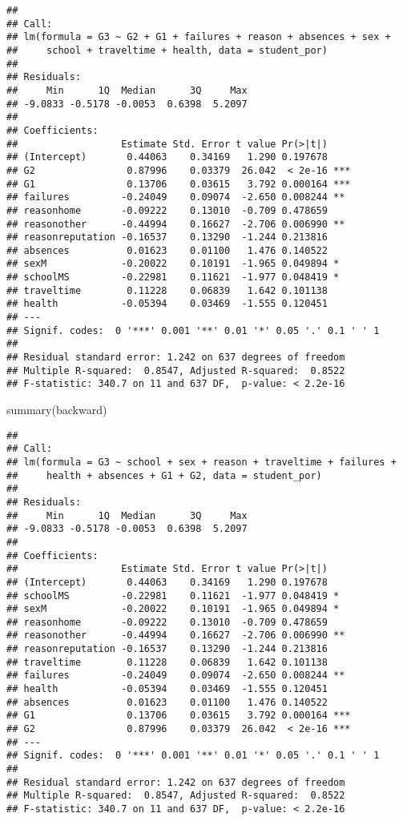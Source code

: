 \documentclass[
]{article}
\newenvironment{Shaded}{\begin{snugshade}}{\end{snugshade}}
\newcommand{\FunctionTok}[1]{\textcolor[rgb]{0.00,0.00,0.00}{#1}}
\newcommand{\NormalTok}[1]{#1}
\begin{document}
\begin{verbatim}
## 
## Call:
## lm(formula = G3 ~ G2 + G1 + failures + reason + absences + sex + 
##     school + traveltime + health, data = student_por)
## 
## Residuals:
##     Min      1Q  Median      3Q     Max 
## -9.0833 -0.5178 -0.0053  0.6398  5.2097 
## 
## Coefficients:
##                  Estimate Std. Error t value Pr(>|t|)    
## (Intercept)       0.44063    0.34169   1.290 0.197678    
## G2                0.87996    0.03379  26.042  < 2e-16 ***
## G1                0.13706    0.03615   3.792 0.000164 ***
## failures         -0.24049    0.09074  -2.650 0.008244 ** 
## reasonhome       -0.09222    0.13010  -0.709 0.478659    
## reasonother      -0.44994    0.16627  -2.706 0.006990 ** 
## reasonreputation -0.16537    0.13290  -1.244 0.213816    
## absences          0.01623    0.01100   1.476 0.140522    
## sexM             -0.20022    0.10191  -1.965 0.049894 *  
## schoolMS         -0.22981    0.11621  -1.977 0.048419 *  
## traveltime        0.11228    0.06839   1.642 0.101138    
## health           -0.05394    0.03469  -1.555 0.120451    
## ---
## Signif. codes:  0 '***' 0.001 '**' 0.01 '*' 0.05 '.' 0.1 ' ' 1
## 
## Residual standard error: 1.242 on 637 degrees of freedom
## Multiple R-squared:  0.8547, Adjusted R-squared:  0.8522 
## F-statistic: 340.7 on 11 and 637 DF,  p-value: < 2.2e-16
\end{verbatim}

\begin{Shaded}
\begin{Highlighting}[]
\FunctionTok{summary}\NormalTok{(backward)}
\end{Highlighting}
\end{Shaded}

\begin{verbatim}
## 
## Call:
## lm(formula = G3 ~ school + sex + reason + traveltime + failures + 
##     health + absences + G1 + G2, data = student_por)
## 
## Residuals:
##     Min      1Q  Median      3Q     Max 
## -9.0833 -0.5178 -0.0053  0.6398  5.2097 
## 
## Coefficients:
##                  Estimate Std. Error t value Pr(>|t|)    
## (Intercept)       0.44063    0.34169   1.290 0.197678    
## schoolMS         -0.22981    0.11621  -1.977 0.048419 *  
## sexM             -0.20022    0.10191  -1.965 0.049894 *  
## reasonhome       -0.09222    0.13010  -0.709 0.478659    
## reasonother      -0.44994    0.16627  -2.706 0.006990 ** 
## reasonreputation -0.16537    0.13290  -1.244 0.213816    
## traveltime        0.11228    0.06839   1.642 0.101138    
## failures         -0.24049    0.09074  -2.650 0.008244 ** 
## health           -0.05394    0.03469  -1.555 0.120451    
## absences          0.01623    0.01100   1.476 0.140522    
## G1                0.13706    0.03615   3.792 0.000164 ***
## G2                0.87996    0.03379  26.042  < 2e-16 ***
## ---
## Signif. codes:  0 '***' 0.001 '**' 0.01 '*' 0.05 '.' 0.1 ' ' 1
## 
## Residual standard error: 1.242 on 637 degrees of freedom
## Multiple R-squared:  0.8547, Adjusted R-squared:  0.8522 
## F-statistic: 340.7 on 11 and 637 DF,  p-value: < 2.2e-16
\end{verbatim}
\end{document}
